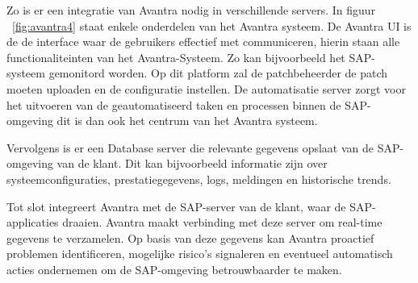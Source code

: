 Zo is er een integratie van Avantra nodig in verschillende servers. In figuur ~\ref{fig:avantra4} staat enkele onderdelen van het Avantra systeem. De Avantra UI is de de interface waar de gebruikers effectief met communiceren, hierin staan alle functionaliteinten van het Avantra-Systeem. Zo kan bijvoorbeeld het SAP-systeem gemonitord worden. Op
dit platform zal de patchbeheerder de patch moeten uploaden en de configuratie instellen. De automatisatie server zorgt voor het uitvoeren van de geautomatiseerd taken en processen binnen de SAP-omgeving dit is dan ook het centrum van het Avantra systeem.

Vervolgens is er een Database server die relevante gegevens opslaat van de SAP-omgeving van de klant. Dit kan bijvoorbeeld informatie zijn over systeemconfiguraties, prestatiegegevens, logs, meldingen en historische trends. 

Tot slot integreert Avantra met de SAP-server van de klant, waar de SAP-applicaties draaien. Avantra maakt verbinding met deze server om real-time gegevens te verzamelen.
Op basis van deze gegevens kan Avantra proactief problemen identificeren, mogelijke risico's signaleren en eventueel automatisch acties ondernemen om de SAP-omgeving betrouwbaarder te maken.

